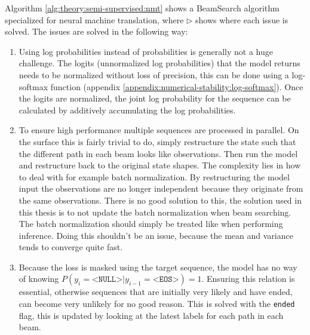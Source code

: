 Algorithm \ref{alg:theory:semi-supervised:nmt} shows a BeamSearch algorithm specialized for neural machine translation, where $\triangleright$ shows where each issue is solved. The issues are solved in the following way:

\begin{enumerate}
\item Using log probabilities instead of probabilities is generally not a huge challenge. The logits (unnormalized log probabilities) that the model returns needs to be normalized without loss of precision, this can be done using a log-softmax function (appendix \ref{appendix:numerical-stability:log-softmax}). Once the logits are normalized, the joint log probability for the sequence can be calculated by additively accumulating the log probabilities.

\item To ensure high performance multiple sequences are processed in parallel. On the surface this is fairly trivial to do, simply restructure the state such that the different path in each beam looks like observations. Then run the model and restructure back to the original state shapes. The complexity lies in how to deal with for example batch normalization. By restructuring the model input the observations are no longer independent because they originate from the same observations. There is no good solution to this, the solution used in this thesis is to not update the batch normalization when beam searching. The batch normalization should simply be treated like when performing inference. Doing this shouldn't be an issue, because the mean and variance tends to converge quite fast.

\item Because the loss is masked using the target sequence, the model has no way of knowing $P(y_i = \texttt{<NULL>} | y_{i-1} = \texttt{<EOS>}) = 1$. Ensuring this relation is essential, otherwise sequences that are initially very likely and have ended, can become very unlikely for no good reason. This is solved with the \texttt{ended} flag, this is updated by looking at the latest labels for each path in each beam.
\end{enumerate}
